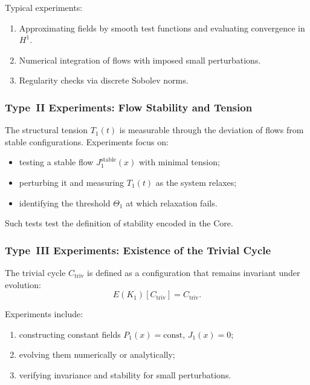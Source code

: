 Typical experiments:

\begin{enumerate}
    \item Approximating fields by smooth test functions and evaluating
          convergence in $H^1$.
    \item Numerical integration of flows with imposed small perturbations.
    \item Regularity checks via discrete Sobolev norms.
\end{enumerate}


\subsubsection{Type~II Experiments: Flow Stability and Tension}

The structural tension $T_1(t)$ is measurable through the deviation of flows
from stable configurations.
Experiments focus on:

\begin{itemize}
    \item testing a stable flow $J_1^{\mathrm{stable}}(x)$ with minimal tension;
    \item perturbing it and measuring $T_1(t)$ as the system relaxes;
    \item identifying the threshold $\Theta_1$ at which relaxation fails.
\end{itemize}

Such tests test the definition of stability encoded in the Core.


\subsubsection{Type~III Experiments: Existence of the Trivial Cycle}

The trivial cycle $C_{\mathrm{triv}}$ is defined as a configuration that
remains invariant under evolution:
\[
    E(K_1)[C_{\mathrm{triv}}] = C_{\mathrm{triv}}.
\]

Experiments include:

\begin{enumerate}
    \item constructing constant fields $P_1(x)=\mathrm{const}$,
          $J_1(x)=0$;
    \item evolving them numerically or analytically;
    \item verifying invariance and stability for small perturbations.
\end{enumerate}

